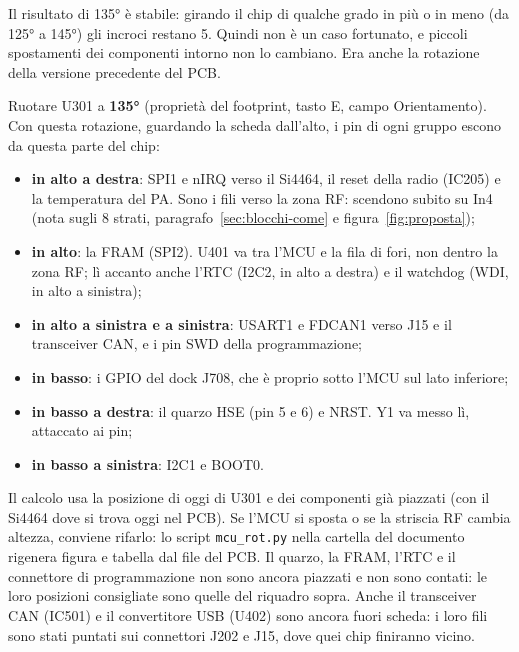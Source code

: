 \documentclass[a4paper,11pt]{article}
\begin{document}
Il risultato di \ang{135} è stabile: girando il chip di qualche grado in più o in meno (da \ang{125} a \ang{145}) gli incroci restano 5. Quindi non è un caso fortunato, e piccoli spostamenti dei componenti intorno non lo cambiano. Era anche la rotazione della versione precedente del PCB.

\begin{regola}[consiglio]
Ruotare U301 a \textbf{\ang{135}} (proprietà del footprint, tasto E, campo Orientamento). Con questa rotazione, guardando la scheda dall'alto, i pin di ogni gruppo escono da questa parte del chip:
\begin{itemize}[nosep]
\item \textbf{in alto a destra}: SPI1 e nIRQ verso il Si4464, il reset della radio (IC205) e la temperatura del PA. Sono i fili verso la zona RF: scendono subito su In4 (nota sugli 8 strati, paragrafo~\ref{sec:blocchi-come} e figura~\ref{fig:proposta});
\item \textbf{in alto}: la FRAM (SPI2). U401 va tra l'MCU e la fila di fori, non dentro la zona RF; lì accanto anche l'RTC (I2C2, in alto a destra) e il watchdog (WDI, in alto a sinistra);
\item \textbf{in alto a sinistra e a sinistra}: USART1 e FDCAN1 verso J15 e il transceiver CAN, e i pin SWD della programmazione;
\item \textbf{in basso}: i GPIO del dock J708, che è proprio sotto l'MCU sul lato inferiore;
\item \textbf{in basso a destra}: il quarzo HSE (pin 5 e 6) e NRST. Y1 va messo lì, attaccato ai pin;
\item \textbf{in basso a sinistra}: I2C1 e BOOT0.
\end{itemize}
\end{regola}

\begin{nota}
Il calcolo usa la posizione di oggi di U301 e dei componenti già piazzati (con il Si4464 dove si trova oggi nel PCB). Se l'MCU si sposta o se la striscia RF cambia altezza, conviene rifarlo: lo script \texttt{mcu\_rot.py} nella cartella del documento rigenera figura e tabella dal file del PCB. Il quarzo, la FRAM, l'RTC e il connettore di programmazione non sono ancora piazzati e non sono contati: le loro posizioni consigliate sono quelle del riquadro sopra. Anche il transceiver CAN (IC501) e il convertitore USB (U402) sono ancora fuori scheda: i loro fili sono stati puntati sui connettori J202 e J15, dove quei chip finiranno vicino.
\end{nota}
\end{document}
